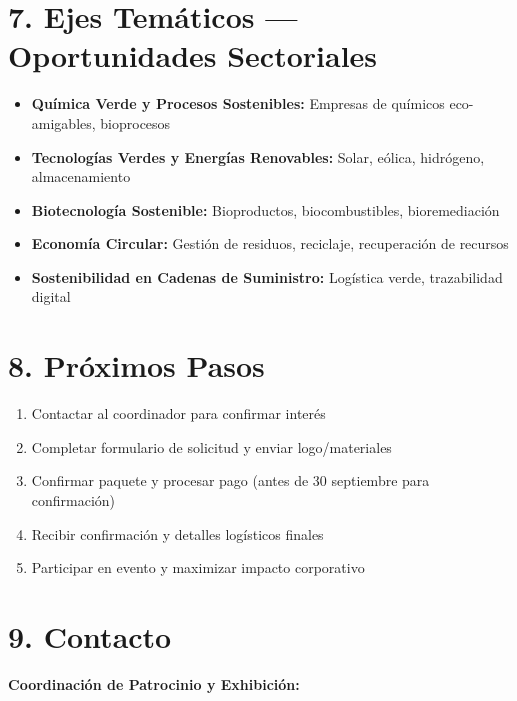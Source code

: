 \documentclass[11pt,a4paper]{article}
\begin{document}
\vspace{0.2cm}

\section*{7. Ejes Temáticos — Oportunidades Sectoriales}

\begin{itemize}\setlength{\itemsep}{0.08cm}
\item \textbf{Química Verde y Procesos Sostenibles:} Empresas de químicos eco-amigables, bioprocesos
\item \textbf{Tecnologías Verdes y Energías Renovables:} Solar, eólica, hidrógeno, almacenamiento
\item \textbf{Biotecnología Sostenible:} Bioproductos, biocombustibles, bioremediación
\item \textbf{Economía Circular:} Gestión de residuos, reciclaje, recuperación de recursos
\item \textbf{Sostenibilidad en Cadenas de Suministro:} Logística verde, trazabilidad digital
\end{itemize}

\vspace{0.2cm}

\section*{8. Próximos Pasos}

\begin{enumerate}\setlength{\itemsep}{0.1cm}
\item Contactar al coordinador para confirmar interés
\item Completar formulario de solicitud y enviar logo/materiales
\item Confirmar paquete y procesar pago (antes de 30 septiembre para confirmación)
\item Recibir confirmación y detalles logísticos finales
\item Participar en evento y maximizar impacto corporativo
\end{enumerate}

\vspace{0.3cm}

\section*{9. Contacto}

\textbf{Coordinación de Patrocinio y Exhibición:}
\end{document}
